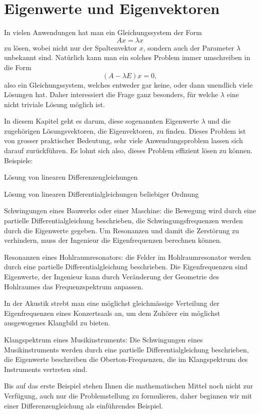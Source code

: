 \chapter{Eigenwerte und Eigenvektoren\label{chapter-eigen}}
In vielen Anwendungen hat man ein Gleichungssystem der Form
\[
Ax=\lambda x
\]
zu lösen, wobei nicht nur der Spaltenvektor $x$, sondern auch der
Parameter $\lambda$ unbekannt sind.
Natürlich kann man ein solches Problem immer umschreiben in die Form
\[
(A-\lambda E) x=0,
\]
also ein Gleichungssystem, welches entweder gar keine, oder dann
unendlich viele Lösungen hat.
Daher interessiert die Frage 
ganz besonders, für welche $\lambda$ eine nicht triviale Lösung möglich ist.

In diesem Kapitel geht es darum, diese sogenannten Eigenwerte $\lambda$
und die zugehörigen Lösungsvektoren, die Eigenvektoren, zu finden.
Dieses
Problem ist von grosser praktischer Bedeutung, sehr viele Anwendungsproblem
lassen sich darauf zurückführen.
Es lohnt sich also, dieses Problem
effizient lösen zu können.
Beispiele:
\begin{compactitem}
\item Lösung von linearen Differenzengleichungen
\item Lösung von linearen Differentialgleichungen beliebiger Ordnung
\item Schwingungen eines Bauwerks oder einer Maschine: die Bewegung wird durch
eine partielle Differentialgleichung beschrieben, die Schwingungsfrequenzen
werden durch die Eigenwerte gegeben.
Um Resonanzen und damit die Zerstörung
zu verhindern, muss der Ingenieur die Eigenfrequenzen
berechnen können.
\item Resonanzen eines Hohlraumresonators: die Felder im Hohlraumresonator
werden durch eine partielle Differentialgleichung beschrieben.
Die Eigenfrequenzen sind Eigenwerte, der Ingenieur kann durch Veränderung
der Geometrie des Hohlraumes das Frequenzspektrum anpassen.
\item
{}
In der
Akustik strebt man eine möglichst gleichmässige Verteilung der Eigenfrequenzen
eines Konzertsaals an, um dem Zuhörer ein möglichst ausgewogenes Klangbild
zu bieten.
\item Klangspektrum eines Musikinstruments: Die Schwingungen eines Musikinstruments
werden durch eine partielle Differentialgleichung beschrieben, die
Eigenwerte beschreiben die Oberton-Frequenzen, die im Klangspektrum des
Instruments vertreten sind.
\end{compactitem}
Bis auf das erste Beispiel stehen Ihnen die mathematischen Mittel noch nicht
zur Verfügung, auch nur die Problemstellung zu formulieren, daher beginnen
wir mit einer Differenzengleichung als einführendes Beispiel.

